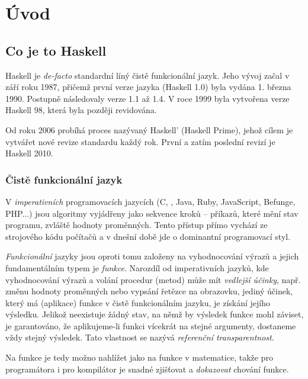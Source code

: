 \chapter{Úvod}

\section{Co je to Haskell}

Haskell je \textit{de-facto} standardní líný čistě funkcionální jazyk. Jeho
vývoj začal v září roku 1987, přičemž první verze jazyka (Haskell 1.0) byla
vydána 1. března 1990. Postupně následovaly verze 1.1 až 1.4. V roce 1999 byla
vytvořena  verze Haskell 98, která
byla později revidována.


Od roku 2006 probíhá proces nazývaný Haskell' (Haskell Prime), jehož cílem je
vytvářet nové revize standardu každý rok. První a zatím poslední revizí je
Haskell 2010.


\subsection{Čistě funkcionální jazyk}

V \emph{imperativních} programovacích jazycích (C, \Cplusplus{}, Java, Ruby,
JavaScript, Befunge, PHP...) jsou algoritmy vyjádřeny jako sekvence kroků --
příkazů, které mění stav programu, zvláště hodnoty proměnných.  Tento přístup
přímo vychází ze strojového kódu počítačů a v dnešní době jde o dominantní
programovací styl.

\emph{Funkcionální} jazyky jsou oproti tomu založeny na vyhodnocování výrazů a
jejich fundamentálním typem je \emph{funkce}. Narozdíl od imperativních jazyků,
kde vyhodnocování výrazů a volání procedur (metod) může mít \emph{vedlejší
účinky}, např. změnu hodnoty proměnných nebo vypsání řetězce na obrazovku,
jediný účinek, který má  (aplikace) funkce v čistě funkcionálním
jazyku, je získání jejího výsledku. Jelikož neexistuje žádný stav, na němž by
výsledek funkce mohl záviset, je garantováno, že aplikujeme-li funkci vícekrát
na stejné argumenty, dostaneme vždy stejný výsledek. Tato vlastnost se nazývá
\emph{referenční transparentnost}.

Na funkce je tedy možno nahlížet jako na funkce v matematice, takže pro
programátora i pro kompilátor je snadné zjišťovat a \emph{dokazovat} chování
funkce.

